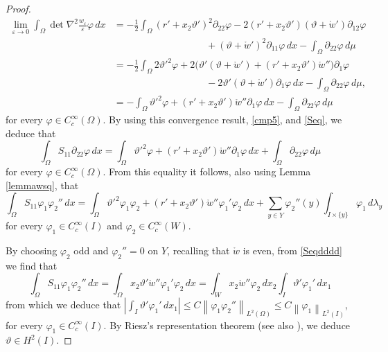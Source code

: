 \documentclass[a4, 11pt, reqno, final]{amsart}
\newcommand{\n}[1]{\left\|#1\right\|}  %
\newcommand\e{\varepsilon}
\theoremstyle{plain}%
\begin{document}
\begin{proof}
$$\begin{aligned}
			\lim_{\e\to 0}\int_\Omega \det \nabla^2 \frac{w_\e}{\e} \varphi \, dx
			&=-\frac12\int_\Omega (r'+x_2\vartheta')^2\partial_{22}\varphi-2 (r'+x_2\vartheta')(\vartheta+\mathring{w}')\partial_{12}\varphi\\
			&\hspace{4cm}+(\vartheta+\mathring{w}')^2 \partial_{11}\varphi\, dx-\int_\Omega \partial_{22}\varphi\,d\mu\\
			&=-\frac12\int_\Omega 2\vartheta'^2\varphi+2 \big(\vartheta'(\vartheta+\mathring{w}')+(r'+x_2\vartheta')\mathring{w}''\big)\partial_{1}\varphi\\
			&\hspace{4cm}-2\vartheta'(\vartheta+\mathring{w}') \partial_{1}\varphi\, dx-\int_\Omega \partial_{22}\varphi\,d\mu,\\
			&=-\int_\Omega \vartheta'^2\varphi+ (r'+x_2\vartheta')\mathring{w}''\partial_{1}\varphi\, dx-\int_\Omega \partial_{22}\varphi\,d\mu
		\end{aligned}
		$$
		for every $\varphi \in C_c^\infty(\Omega)$.
		By using this convergence result, \eqref{cmp5}, and \eqref{Seq}, we deduce that
		\begin{equation*}
			\int_\Omega S_{11}\partial_{22}\varphi\, dx=
			\int_\Omega \vartheta'^2\varphi+ (r'+x_2\vartheta')\mathring{w}''\partial_{1}\varphi\, dx+\int_\Omega \partial_{22}\varphi\,d\mu
		\end{equation*}
		for every $\varphi \in C_c^\infty(\Omega)$.
		From this equality it follows, also using Lemma \ref{lemmawsq}, that
		\begin{equation}\label{Seqdddd}
			\int_\Omega S_{11}\varphi_1\varphi_2''\, dx=
			\int_\Omega \vartheta'^2\varphi_1\varphi_2+ (r'+x_2\vartheta')\mathring{w}''\varphi_1'\varphi_2\, dx+ \sum_{y\in Y} \varphi_2''(y)\int_{I\times\{y\}} \varphi_1\,d\lambda_y
		\end{equation}
		for every $\varphi_1 \in C_c^\infty(I)$ and $\varphi_2 \in C_c^\infty(W)$.

		By choosing $\varphi_2$ odd and $\varphi_2''=0$ on $Y$, recalling that $\mathring{w}$ is even,
		from \eqref{Seqdddd} we find that
		$$
		\int_\Omega S_{11}\varphi_1\varphi_2''\, dx=
		\int_\Omega x_2\vartheta'\mathring{w}''\varphi_1'\varphi_2\, dx=\int_W x_2\mathring{w}''\varphi_2\, dx_2\int_I \vartheta'\varphi_1'\, dx_1
		$$
		from which we deduce that $|\int_I \vartheta' \varphi_1' \, dx_1| \leq C \n{\varphi_1\varphi_2''}_{L^2(\Omega)}\le C\n{\varphi_1}_{L^2(I)}$, for every $\varphi_1 \in C_c^\infty(I)$.  By Riesz's representation theorem (see also \cite[Proposition 8.3]{Brezis2011}), we deduce $\vartheta \in H^2(I)$.


\end{proof}
\end{document}
